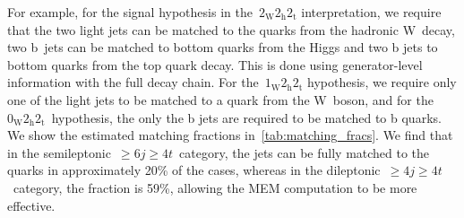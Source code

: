 For example, for the signal hypothesis in the~$2_{\mathrm{W}} 2_{\mathrm{h}} 2_{\mathrm{t}}$ interpretation, we require that the two light jets can be matched to the quarks from the hadronic W~decay, two b~jets can be matched to bottom quarks from the Higgs and two b jets to bottom quarks from the top quark decay. This is done using generator-level information with the full decay chain. For the~$1_{\mathrm{W}} 2_{\mathrm{h}} 2_{\mathrm{t}}$ hypothesis, we require only one of the light jets to be matched to a quark from the W~boson, and for the~$0_{\mathrm{W}} 2_{\mathrm{h}} 2_{\mathrm{t}}$~hypothesis, the only the b jets are  required to be matched to b quarks. We show the estimated matching fractions in~\cref{tab:matching_fracs}. We find that in the semileptonic~$\geq6j\geq4t$~category, the jets can be fully matched to the quarks in approximately 20\% of the cases, whereas in the dileptonic~$\geq4j\geq4t$~category, the fraction is 59\%, allowing the MEM computation to be more effective.

